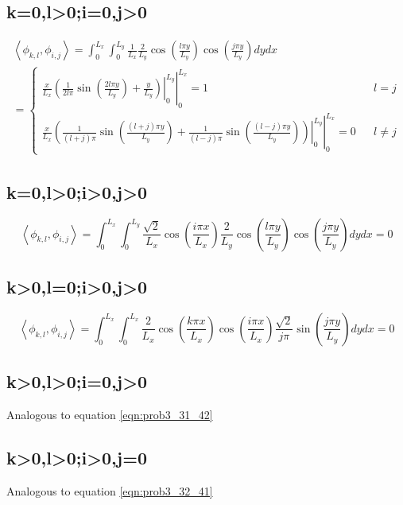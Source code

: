 \documentclass[12pt]{article}
\begin{document}
\subsection*{k=0,l>0;i=0,j>0}
\begin{multline}
\left<\phi_{k,l},\phi_{i,j}\right>=\int_{0}^{L_x} \int_{0}^{L_y} \frac{1}{L_x}\frac{2}{L_y}\cos(\frac{l \pi y}{L_y})\cos(\frac{j \pi y}{L_y})dydx \\
=\left\{\begin{array}{rcl}
\left.\left.\frac{x}{L_x}\left(\frac{1}{2l \pi}\sin(\frac{2l  \pi y}{L_y})+ \frac{y}{L_y} \right)\right|_{0}^{L_y} \right|_{0}^{L_x}=1 & & {l=j}\\
\left.\left.\frac{x}{L_x}\left(\frac{1}{(l+j) \pi}\sin(\frac{(l+j) \pi y}{L_y})+\frac{1}{(l-j) \pi}\sin(\frac{(l-j) \pi y}{L_y})\right)\right|_{0}^{L_y} \right|_{0}^{L_x} =0 & & {l \neq j}
\end{array}\right.
\label{eqn:prob3_30_42}
\end{multline}
\subsection*{k=0,l>0;i>0,j>0}
\begin{equation}
\left<\phi_{k,l},\phi_{i,j}\right>=\int_{0}^{L_x} \int_{0}^{L_y} \frac{\sqrt{2}}{L_x}\cos(\frac{i \pi x}{L_x}) 
\frac{2}{L_y}\cos(\frac{l \pi y}{L_y})\cos(\frac{j \pi y}{L_y})dydx =0
\label{eqn:prob3_31_42}
\end{equation}

\subsection*{k>0,l=0;i>0,j>0}
\begin{equation}
\left<\phi_{k,l},\phi_{i,j}\right>=\int_{0}^{L_x} \int_{0}^{L_x} \frac{2}{L_x}\cos(\frac{k \pi x}{L_x})\cos(\frac{i \pi x}{L_x})\frac{\sqrt{2}}{j \pi}\sin(\frac{j \pi y}{L_y})
dydx=0
\label{eqn:prob3_32_41}
\end{equation}

\subsection*{k>0,l>0;i=0,j>0}
Analogous to equation \eqref{eqn:prob3_31_42}
\subsection*{k>0,l>0;i>0,j=0}
Analogous to equation \eqref{eqn:prob3_32_41}
\end{document}
